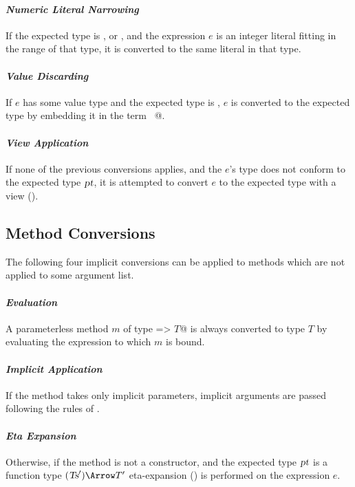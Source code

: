 \paragraph{\em Numeric Literal Narrowing}
If the expected type is ,  or , and
the expression $e$ is an integer literal fitting in the range of that
type, it is converted to the same literal in that type.

\paragraph{\em Value Discarding}
If $e$ has some value type and the expected type is ,
$e$ is converted to the expected type by embedding it in the 
term ~@.

\paragraph{\em View Application}
If none of the previous conversions applies, and the $e$'s type
does not conform to the expected type $\mbox{\sl pt}$, it is attempted to convert
$e$ to the expected type with a view ().\bigskip

\subsection{Method Conversions}

The following four implicit conversions can be applied to methods
which are not applied to some argument list.

\paragraph{\em Evaluation}
A parameterless method $m$ of type \lstinline@=> $T$@ is always converted to
type $T$ by evaluating the expression to which $m$ is bound.

\paragraph{\em Implicit Application}
  If the method takes only implicit parameters, implicit
  arguments are passed following the rules of .

\paragraph{\em Eta Expansion}
  Otherwise, if the method is not a constructor, 
  and the expected type $\mbox{\sl pt}$ is a function type
  $(\Ts') \Arrow T'$ eta-expansion
  () is performed on the
  expression $e$.

